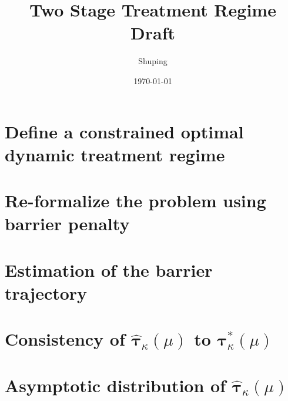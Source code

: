 \documentclass[12pt]{article}
\title{Two Stage Treatment Regime Draft}
\author{Shuping}
\date{\today }
\newcommand{\wh}{\widehat}
\newcommand{\itl}{\intercal}
\newcommand{\bs}{ \boldsymbol}
\newcommand{\mb}{\mathbb}
\newcommand{\lt}{\left}
\newcommand{\rt}{\right}
\begin{document}
\maketitle
\doublespacing
\setlength\parindent{0pt}

\section{Define a constrained optimal dynamic treatment regime}

\section{Re-formalize the problem using barrier penalty}

\section{Estimation of the barrier trajectory}

\section{Consistency of $\widehat{\boldsymbol{\tau}}_{\kappa}(\mu)$ to $\boldsymbol{\tau}_{\kappa}^*(\mu)$}
%

\section{Asymptotic distribution of $\widehat{\boldsymbol{\tau}}_{\kappa}(\mu)$}
 
\begin{comment}
Step 1:  $\underset{\bs{\tau}:\bs{\tau}_1^\itl \bs{\tau}_1=1, \bs{\tau}_2^\itl \bs{\tau}_2=1}{\sup}\lt|\wh{S}_{\kappa}(\bs{\tau}, \mu)-S^*_{\kappa}(\bs{\tau},  \mu)\rt|=o_{p}(1).$ \\

Step 2:  conditions for $\wh{F}_{Y_n}(y;\bs{\tau}) \to F_Y(y;\bs{\tau}), \text{as } n \to \infty$\\

Step 3:  Consistency of $\wh{\bs{\tau}}_{\kappa,\mu} \to \bs{\tau}^*_{\kappa,\mu}$. It can be proven by following similar proof in Lemma 2 at one-stage. \\

Step 4: Asymptotic Normality of $\wh{\bs{\tau}}_{\kappa,\mu}$ \\

Step 5: Projected CI for $\wh{\mb{E}} Y_n(\wh{\bs{\tau}}_{n,\kappa})$\\

Step 6: Bootstrap Monte Carlo Sampling


\end{comment}
\end{document}
